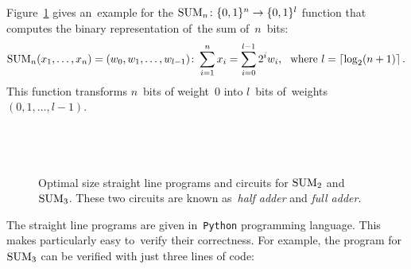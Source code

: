 Figure~\ref{figure:sum23} gives an~example for
the
$\operatorname{SUM}_n \colon \{0,1\}^n \to \{0,1\}^l$ function
that computes the binary representation of~the sum of~$n$~bits:
\[\operatorname{SUM}_n(x_1, \dotsc, x_n)=(w_0, w_1, \dotsc, w_{l-1})\colon \sum_{i=1}^{n}x_i=\sum_{i=0}^{l-1}2^iw_i \text{, \, where } l=\lceil \log_2(n+1)\rceil \, .\]
This function transforms $n$~bits
of weight~0 into $l$~bits
of~weights $(0,1,\dotsc,l-1)$.
%
\begin{figure}[t]
\begin{minipage}{.28\textwidth}
\inputminted[firstline=15,lastline=18]{python}{../tutorial.py}
\end{minipage}
\begin{minipage}{.18\textwidth}
\end{minipage}
\begin{minipage}{.33\textwidth}
\inputminted[firstline=22,lastline=28]{python}{../tutorial.py}
\end{minipage}
\begin{minipage}{.18\textwidth}
~
\end{minipage}
\caption{Optimal size straight line programs and circuits for $\operatorname{SUM}_2$ and $\operatorname{SUM}_3$. These two circuits are known as~\emph{half adder} and \emph{full adder}.}
\label{figure:sum23}
\end{figure}
%
The straight line
programs are given
in~\texttt{Python} programming language.
This makes particularly easy to~verify their correctness.
For example, the program for $\operatorname{SUM}_3$ can be verified
with just three lines of code:
\inputminted[firstline=32,lastline=36]{python}{../tutorial.py}

